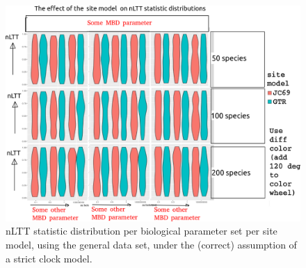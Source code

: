 \documentclass{article}
\begin{document}
\begin{figure}[!htbp]
  \includegraphics[width=\textwidth]{fig_site_model.png}
  \caption{
    nLTT statistic distribution per biological parameter set per site model,
    using the general data set, 
    under the (correct) assumption of a strict clock model.
  }
\end{figure}
\end{document}
